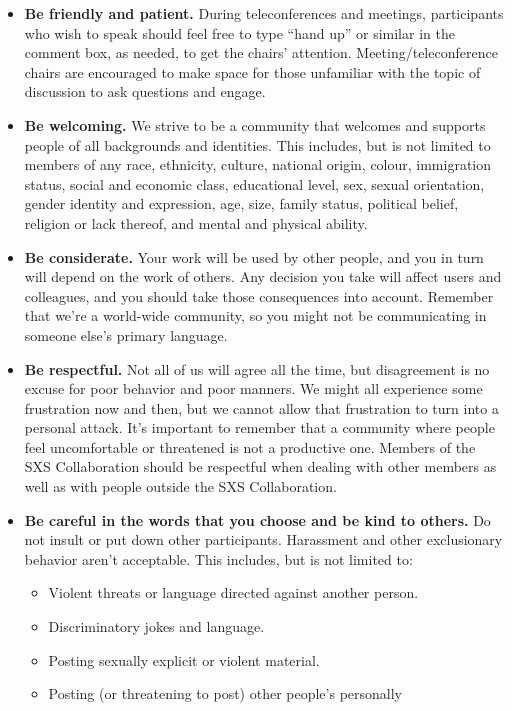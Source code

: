 \begin{itemize}
\item \textbf{Be friendly and patient.} During teleconferences and
  meetings, participants who wish to speak should feel free to type
  “hand up” or similar in the comment box, as needed, to get the
  chairs’ attention. Meeting/teleconference chairs are encouraged to
  make space for those unfamiliar with the topic of discussion to ask
  questions and engage.
\item \textbf{Be welcoming.} We strive to be a community that welcomes
  and supports people of all backgrounds and identities. This
  includes, but is not limited to members of any race, ethnicity,
  culture, national origin, colour, immigration status, social and
  economic class, educational level, sex, sexual orientation, gender
  identity and expression, age, size, family status, political belief,
  religion or lack thereof, and mental and physical ability.
\item \textbf{Be considerate.} Your work will be used by other people,
  and you in turn will depend on the work of others. Any decision you
  take will affect users and colleagues, and you should take those
  consequences into account. Remember that we’re a world-wide
  community, so you might not be communicating in someone else’s
  primary language.
\item \textbf{Be respectful.} Not all of us will agree all the time,
  but disagreement is no excuse for poor behavior and poor manners. We
  might all experience some frustration now and then, but we cannot
  allow that frustration to turn into a personal attack. It’s
  important to remember that a community where people feel
  uncomfortable or threatened is not a productive one. Members of the
  SXS Collaboration should be respectful when dealing with other
  members as well as with people outside the SXS Collaboration.
\item \textbf{Be careful in the words that you choose and be kind to
    others.} Do not insult or put down other participants. Harassment
  and other exclusionary behavior aren’t acceptable. This includes,
  but is not limited to:
  \begin{itemize}
  \item Violent threats or language directed against another person.
  \item Discriminatory jokes and language.
  \item Posting sexually explicit or violent material.
  \item Posting (or threatening to post) other people’s personally

\end{itemize}
\end{itemize}
